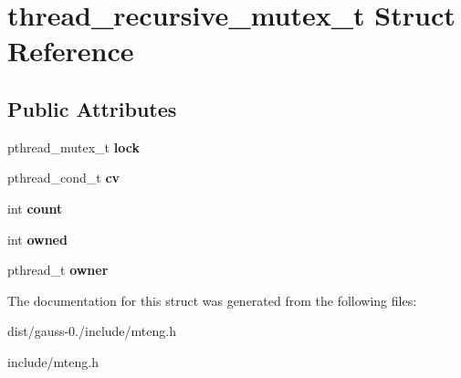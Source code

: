 \hypertarget{structthread__recursive__mutex__t}{\section{thread\-\_\-recursive\-\_\-mutex\-\_\-t Struct Reference}
\label{structthread__recursive__mutex__t}
}
\subsection*{Public Attributes}
\begin{DoxyCompactItemize}
\item 
\hypertarget{structthread__recursive__mutex__t_a0ec9ce1fbb674a838bc4934824f7852a}{pthread\-\_\-mutex\-\_\-t {\bfseries lock}}\label{structthread__recursive__mutex__t_a0ec9ce1fbb674a838bc4934824f7852a}

\item 
\hypertarget{structthread__recursive__mutex__t_aa5f5c24726168ca1c317ca487d286564}{pthread\-\_\-cond\-\_\-t {\bfseries cv}}\label{structthread__recursive__mutex__t_aa5f5c24726168ca1c317ca487d286564}

\item 
\hypertarget{structthread__recursive__mutex__t_a21c1ddbc6494081a6a8268db591d28e7}{int {\bfseries count}}\label{structthread__recursive__mutex__t_a21c1ddbc6494081a6a8268db591d28e7}

\item 
\hypertarget{structthread__recursive__mutex__t_a595ef7fb5e4e43c3e4a21f43c8f53417}{int {\bfseries owned}}\label{structthread__recursive__mutex__t_a595ef7fb5e4e43c3e4a21f43c8f53417}

\item 
\hypertarget{structthread__recursive__mutex__t_afeada486a4b013644f5672ebd20e96a0}{pthread\-\_\-t {\bfseries owner}}\label{structthread__recursive__mutex__t_afeada486a4b013644f5672ebd20e96a0}

\end{DoxyCompactItemize}


The documentation for this struct was generated from the following files\-:\begin{DoxyCompactItemize}
\item 
dist/gauss-\/0./include/mteng.\-h\item 
include/mteng.\-h\end{DoxyCompactItemize}

